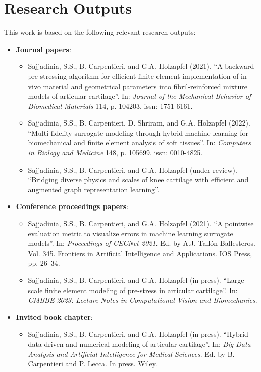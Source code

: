 \chapter*{Research Outputs}
This work is based on the following relevant research outputs:
%
\begin{itemize}
\item \textbf{Journal papers}:
\begin{itemize}
    \item Sajjadinia, S.S., B. Carpentieri, and G.A. Holzapfel (2021). ``A backward pre-stressing algorithm for efficient finite element implementation of in vivo material and geometrical parameters into fibril-reinforced mixture models of articular cartilage''. In: \textit{Journal of the Mechanical Behavior of Biomedical Materials} 114, p. 104203. issn: 1751-6161.
    \item Sajjadinia, S.S., B. Carpentieri, D. Shriram, and G.A. Holzapfel (2022). ``Multi-fidelity surrogate modeling through hybrid machine learning for biomechanical and finite element analysis of soft tissues''. In: \textit{Computers in Biology and Medicine} 148, p. 105699. issn: 0010-4825.
    \item Sajjadinia, S.S., B. Carpentieri, and G.A. Holzapfel (under review). ``Bridging diverse physics and scales of knee cartilage with efficient and augmented graph representation learning''.
\end{itemize}
\item \textbf{Conference proceedings papers}:
\begin{itemize}
    \item Sajjadinia, S.S., B. Carpentieri, and G.A. Holzapfel (2021). ``A pointwise evaluation metric to visualize errors in machine learning surrogate models''. In: \textit{Proceedings of CECNet 2021}. Ed. by A.J. Tall\'{o}n-Ballesteros. Vol. 345. Frontiers in Artificial Intelligence and Applications. IOS Press, pp. 26–34.
    \item Sajjadinia, S.S., B. Carpentieri, and G.A. Holzapfel (in press). ``Large-scale finite element modeling of pre-stress in articular cartilage''. In: \textit{CMBBE 2023: Lecture Notes in Computational Vision and Biomechanics}.
\end{itemize}
\item \textbf{Invited book chapter}:
\begin{itemize}
    \item Sajjadinia, S.S., B. Carpentieri, and G.A. Holzapfel (in press). ``Hybrid data-driven and numerical modeling of articular cartilage''. In: \textit{Big Data Analysis and Artificial Intelligence for Medical Sciences}. Ed. by B. Carpentieri and P. Lecca. In press. Wiley.

\end{itemize}
\end{itemize}
